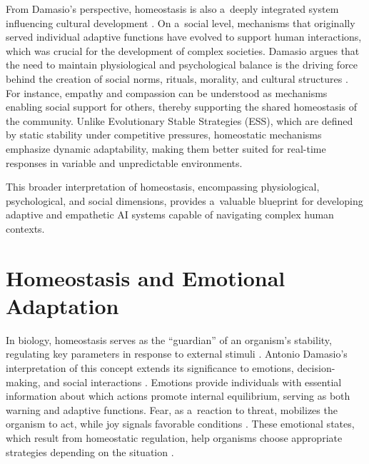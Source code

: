 \documentclass[%
  manuscript=article,
  year=2024,
  volume=77,
  doi=10.59203/zfn.77.706,
]{zfn}
\begin{document}
From Damasio's perspective, homeostasis is also a~deeply integrated system influencing cultural development 
\parencites[][]{klos_neuron_2014}[][]{damasio_strange_2018}. %
 On a~social level, mechanisms that originally served individual adaptive functions have evolved to support human interactions, which was crucial for the development of complex societies. Damasio argues that the need to maintain physiological and psychological balance is the driving force behind the creation of social norms, rituals, morality, and cultural structures 
\parencite[][]{damasio_strange_2018}. %
 For instance, empathy and compassion can be understood as mechanisms enabling social support for others, thereby supporting the shared homeostasis of the community. Unlike Evolutionary Stable Strategies (ESS), which are defined by static stability under competitive pressures, homeostatic mechanisms emphasize dynamic adaptability, making them better suited for real-time responses in variable and unpredictable environments.



This broader interpretation of homeostasis, encompassing physiological, psychological, and social dimensions, provides a~valuable blueprint for developing adaptive and empathetic AI systems capable of navigating complex human contexts.



\section*{Homeostasis and Emotional Adaptation}

In biology, homeostasis serves as the ``guardian'' of an organism's stability, regulating key parameters in response to external stimuli 
\parencites[][]{giordano_homeostasis_2013}[][]{davies_adaptive_2016}. %
 Antonio Damasio's interpretation of this concept extends its significance to emotions, decision-making, and social interactions 
\parencite[][]{damasio_homeostatic_2022}. %
 Emotions provide individuals with essential information about which actions promote internal equilibrium, serving as both warning and adaptive functions. Fear, as a~reaction to threat, mobilizes the organism to act, while joy signals favorable conditions 
\parencite[][]{piolopez_advances_2023}. %
 These emotional states, which result from homeostatic regulation, help organisms choose appropriate strategies depending on the situation 
\parencite[][]{goldstein_how_2019}.%
~
\end{document}
